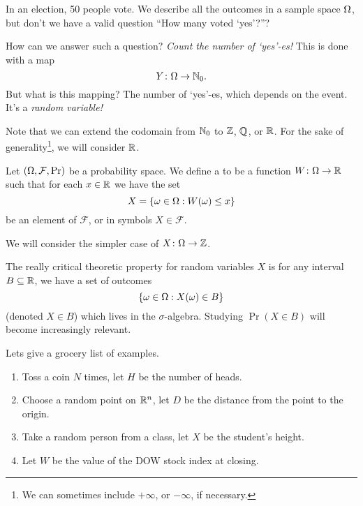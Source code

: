 \M
In an election, 50 people vote. We describe all the outcomes in a sample
space $\Omega$, but don't we have a valid question ``How many
voted `yes'?''? 

How can we answer such a question? \emph{Count the number of `yes'-es!}
This is done with a map
\begin{equation}
Y\colon\Omega\to\mathbb{N}_{0}.
\end{equation}
But what is this mapping? The number of `yes'-es, which depends on the
event. It's a \emph{random variable!}

Note that we can extend the codomain from $\mathbb{N}_0$ to $\mathbb{Z}$, $\mathbb{Q}$, or
$\mathbb{R}$. For the sake of generality\footnote{We can sometimes include
$+\infty$, or $-\infty$, if necessary.}, we will consider $\mathbb{R}$.

Let $(\Omega,\mathcal{F},\mathop{\mathrm{Pr}}\nolimits)$ be a probability space. We define a
 to be a function $W\colon\Omega\to\mathbb{R}$
such that for each $x\in\mathbb{R}$ we have the set
\begin{equation}
X = \{ \omega\in\Omega : W(\omega)\leq x\}
\end{equation}
be an element of $\mathcal{F}$, or in symbols $X\in\mathcal{F}$. 

\begin{rmk}
We will consider the simpler case of 
$X\colon\Omega\to\mathbb{Z}$. 
\end{rmk}

The really critical theoretic property for random variables $X$ is for
any interval $B\subseteq\mathbb{R}$, we have a set of outcomes
\begin{equation}
\{\omega\in\Omega : X(\omega)\in B\}
\end{equation}
(denoted $X\in B$) which lives in the $\sigma$-algebra. Studying
$\Pr(X\in B)$ will become increasingly relevant.

Lets give a grocery list of examples.
\begin{enumerate}
\item Toss a coin $N$ times, let $H$ be the number of heads.
\item Choose a random point on $\mathbb{R}^{n}$, let $D$ be the distance from
the point to the origin.
\item Take a random person from a class, let $X$ be the student's
height.
\item Let $W$ be the value of the DOW stock index at closing.
\end{enumerate}

